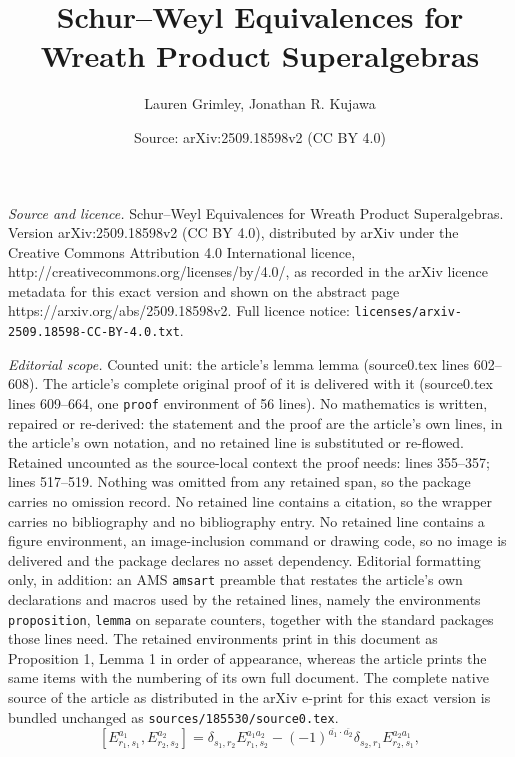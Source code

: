 \documentclass[10pt,a4paper]{amsart}
\title{Schur--Weyl Equivalences for Wreath Product Superalgebras}
\author{Lauren Grimley, Jonathan R. Kujawa}
\date{Source: arXiv:2509.18598v2 (CC BY 4.0)}
\newcommand{\parity}[1]{\overline{#1}}
\begin{document}
\maketitle

\noindent\emph{Source and licence.} Schur--Weyl Equivalences for Wreath Product Superalgebras. Version arXiv:2509.18598v2 (CC BY 4.0), distributed by arXiv under the Creative Commons Attribution 4.0 International licence, http://creativecommons.org/licenses/by/4.0/, as recorded in the arXiv licence metadata for this exact version and shown on the abstract page https://arxiv.org/abs/2509.18598v2. Full licence notice: \texttt{licenses/arxiv-2509.18598-CC-BY-4.0.txt}.\par\smallskip

\noindent\textit{Editorial scope.} Counted unit: the article's lemma lemma (source0.tex lines 602--608). The article's complete original proof of it is delivered with it (source0.tex lines 609--664, one \texttt{proof} environment of 56 lines). No mathematics is written, repaired or re-derived: the statement and the proof are the article's own lines, in the article's own notation, and no retained line is substituted or re-flowed.  Retained uncounted as the source-local context the proof needs: lines 355--357; lines 517--519.  Nothing was omitted from any retained span, so the package carries no omission record.  No retained line contains a citation, so the wrapper carries no bibliography and no bibliography entry.  No retained line contains a figure environment, an image-inclusion command or drawing code, so no image is delivered and the package declares no asset dependency.  Editorial formatting only, in addition: an AMS \texttt{amsart} preamble that restates the article's own declarations and macros used by the retained lines, namely the environments \texttt{proposition}, \texttt{lemma} on separate counters, together with the standard packages those lines need.  The retained environments print in this document as Proposition 1, Lemma 1 in order of appearance, whereas the article prints the same items with the numbering of its own full document.  The complete native source of the article as distributed in the arXiv e-print for this exact version is bundled unchanged as \texttt{sources/185530/source0.tex}.
\begin{equation}\label{E:supercommutator}
[E_{r_{1},s_{1}}^{a_{1}}, E_{r_{2},s_{2}}^{a_{2}}] = \delta_{s_{1}, r_{2}} E_{r_{1},s_{2}}^{a_{1}a_{2}} - (-1)^{\parity{a_{1}}\cdot \parity{a_{2}}} \delta_{s_{2}, r_{1}} E_{r_{2},s_{1}}^{a_{2}a_{1}},
\end{equation}
\end{document}
